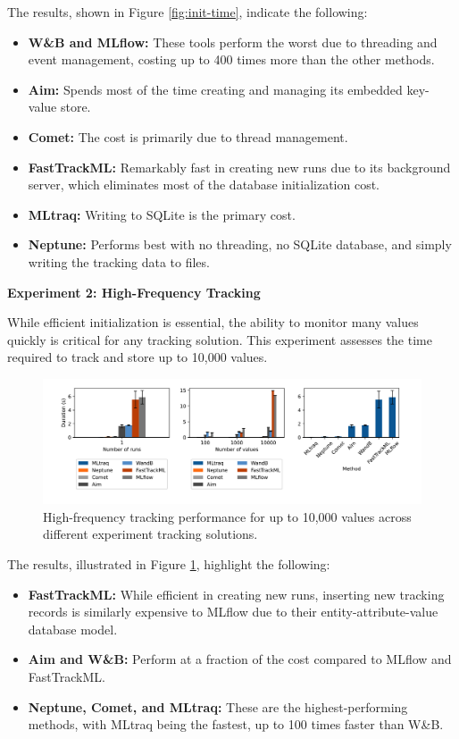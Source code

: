 The results, shown in Figure \ref{fig:init-time}, indicate the following:

\begin{itemize}
    \item \textbf{W\&B and MLflow:} These tools perform the worst due to threading and event management, costing up to 400 times more than the other methods.
    \item \textbf{Aim:} Spends most of the time creating and managing its embedded key-value store.
    \item \textbf{Comet:} The cost is primarily due to thread management.
    \item \textbf{FastTrackML:} Remarkably fast in creating new runs due to its background server, which eliminates most of the database initialization cost.
    \item \textbf{MLtraq:} Writing to SQLite is the primary cost.
    \item \textbf{Neptune:} Performs best with no threading, no SQLite database, and simply writing the tracking data to files. \newline
\end{itemize}

\textbf{Experiment 2: High-Frequency Tracking}

While efficient initialization is essential, the ability to monitor many values quickly is critical for any tracking solution. This experiment assesses the time required to track and store up to 10,000 values.

\begin{figure}[h!]
    \centering
    \includegraphics[width=\textwidth]{images/mltraq/mltraq-high-frequency.png}
    \caption{High-frequency tracking performance for up to 10,000 values across different experiment tracking solutions.}
    \label{fig:high-freq}
\end{figure}

The results, illustrated in Figure \ref{fig:high-freq}, highlight the following:

\begin{itemize}
    \item \textbf{FastTrackML:} While efficient in creating new runs, inserting new tracking records is similarly expensive to MLflow due to their entity-attribute-value database model.
    \item \textbf{Aim and W\&B:} Perform at a fraction of the cost compared to MLflow and FastTrackML.
    \item \textbf{Neptune, Comet, and MLtraq:} These are the highest-performing methods, with MLtraq being the fastest, up to 100 times faster than W\&B.\newline
\end{itemize}


